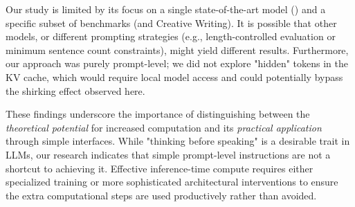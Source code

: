 Our study is limited by its focus on a single state-of-the-art model (\gpt) and a specific subset of benchmarks (\tqa and Creative Writing). It is possible that other models, or different prompting strategies (e.g., length-controlled evaluation or minimum sentence count constraints), might yield different results. Furthermore, our approach was purely prompt-level; we did not explore "hidden" tokens in the KV cache, which would require local model access and could potentially bypass the shirking effect observed here.

These findings underscore the importance of distinguishing between the \textit{theoretical potential} for increased computation and its \textit{practical application} through simple interfaces. While "thinking before speaking" is a desirable trait in LLMs, our research indicates that simple prompt-level instructions are not a shortcut to achieving it. Effective inference-time compute requires either specialized training or more sophisticated architectural interventions to ensure the extra computational steps are used productively rather than avoided.